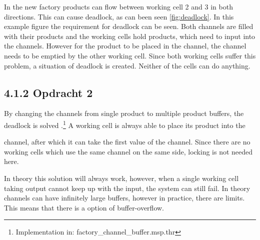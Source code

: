 \documentclass[a4paper,12px]{article}
\begin{document}
In the new factory products can flow between working cell 2 and 3 in both
directions. This can cause deadlock, as can been seen \autoref{fig:deadlock}.
In this example figure the requirement for deadlock can be seen. Both channels
are filled with their products and the working cells hold products, which need
to input into the channels. However for the product to be placed in the
channel, the channel needs to be emptied by the other working cell. Since both
working cells suffer this problem, a situation of deadlock is created. Neither
of the cells can do anything.

\subsection{4.1.2 Opdracht 2}

By changing the channels from single product to multiple product buffers, the
deadlock is solved .\footnote{Implementation in:
factory\_channel\_buffer.msp.thr} A working cell is always able to place its
product into the

channel, after which it can take the first value of the channel. Since there
are no working cells which use the same channel on the same side, locking is
not needed here.

In theory this solution will always work, however, when a single working cell
taking output cannot keep up with the input, the system can still fail. In
theory channels can have infinitely large buffers, however in practice, there
are limits. This means that there is a option of buffer-overflow.



% 
% 
\end{document}
